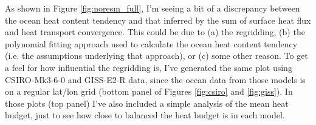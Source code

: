 As shown in Figure \ref{fig:noresm_full}, I'm seeing a bit of a discrepancy between the ocean heat content tendency and that inferred by the sum of surface heat flux and heat transport convergence. This could be due to (a) the regridding, (b) the polynomial fitting approach used to calculate the ocean heat content tendency (i.e. the assumptions underlying that approach), or (c) some other reason. To get a feel for how influential the regridding is, I've generated the same plot using CSIRO-Mk3-6-0 and GISS-E2-R data, since the ocean data from those models is on a regular lat/lon grid (bottom panel of Figures \ref{fig:csiro} and \ref{fig:giss}). In those plots (top panel) I've also included a simple analysis of the mean heat budget, just to see how close to balanced the heat budget is in each model.